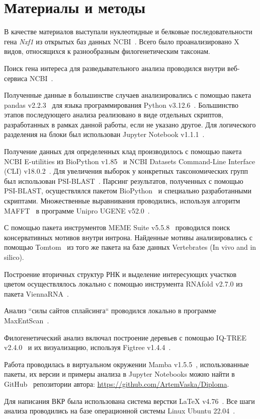 \newpage
\section{Материалы и методы}

В качестве материалов выступали нуклеотидные и белковые последовательности гена \textit{Nxf1} из открытых баз данных NCBI~\cite{ncbi_general}.
Всего было проанализировано X видов, относящихся к разнообразным филогенетическим таксонам.

Поиск гена интереса для разведывательного анализа проводился внутри веб-сервиса NCBI~\cite{ncbi_general}.

Полученные данные в большинстве случаев анализировались с помощью пакета pandas v2.2.3~\cite{pandas} для языка программирования Python v3.12.6~\cite{python_3_12}.
Большинство этапов последующего анализа реализовано в виде отдельных скриптов, разработанных в рамках данной работы, если не указано другое.
Для логического разделения на блоки был использован Jupyter Notebook v1.1.1~\cite{jupyter_notebook}.

Получение данных для определенных клад производилось с помощью пакета NCBI E-utilities из Bio\-Python v1.85~\cite{biopython} и NCBI Datasets Command-Line Interface (CLI) v18.0.2~\cite{datasets}.
Для увеличения выборок у конкретных таксономических групп был использован PSI-BLAST~\cite{psi_blast}.
Парсинг результатов, полученных с помощью PSI-BLAST, осуществлялся пакетом Bio\-Python~\cite{biopython} и специально разработанными скриптами.
Множественные выравнивания проводились, используя алгоритм MAFFT~\cite{mafft} в программе Unipro UGENE v52.0~\cite{ugene}.

С помощью пакета инструментов MEME Suite v5.5.8~\cite{meme} проводился поиск консервативных мотивов внутри интрона.
Найденные мотивы анализировались с помощью Tomtom~\cite{tomtom} из того же пакета на базе данных Vertebrates (In vivo and in silico).

Построение вторичных структур РНК и выделение интересующих участков цветом осуществлялось локально с помощью инструмента RNAfold v2.7.0 из пакета ViennaRNA~\cite{viennarna}.

Анализ ``силы сайтов сплайсинга`` проводился локально в программе Max\-Ent\-Scan~\cite{maxentsccan}.

Филогенетический анализ включал построение деревьев с помощью IQ-TREE v2.4.0~\cite{iqtree2} и их визуализацию, используя Figtree v1.4.4~\cite{figtree}.

Работа проводилась в виртуальном окружении Mamba v1.5.5~\cite{mamba}, использованные пакеты, их версии и примеры анализа в Jupyter Notebooks можно найти в GitHub~\cite{github_general} репозитории автора: \url{https://github.com/ArtemVaska/Diploma}.

Для написания ВКР была использована система верстки LaTeX v4.76~\cite{latex}.
Все шаги анализа проводились на базе операционной системы Linux Ubuntu 22.04~\cite{ubuntu}.
